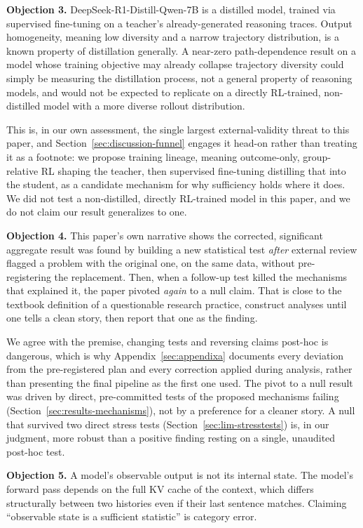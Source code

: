 \documentclass{article}
\begin{document}
\textbf{Objection 3.} DeepSeek-R1-Distill-Qwen-7B is a distilled model, trained via supervised fine-tuning on a teacher's already-generated reasoning traces. Output homogeneity, meaning low diversity and a narrow trajectory distribution, is a known property of distillation generally. A near-zero path-dependence result on a model whose training objective may already collapse trajectory diversity could simply be measuring the distillation process, not a general property of reasoning models, and would not be expected to replicate on a directly RL-trained, non-distilled model with a more diverse rollout distribution.

This is, in our own assessment, the single largest external-validity threat to this paper, and Section~\ref{sec:discussion-funnel} engages it head-on rather than treating it as a footnote: we propose training lineage, meaning outcome-only, group-relative RL shaping the teacher, then supervised fine-tuning distilling that into the student, as a candidate mechanism for why sufficiency holds where it does. We did not test a non-distilled, directly RL-trained model in this paper, and we do not claim our result generalizes to one.

\textbf{Objection 4.} This paper's own narrative shows the corrected, significant aggregate result was found by building a new statistical test \emph{after} external review flagged a problem with the original one, on the same data, without pre-registering the replacement. Then, when a follow-up test killed the mechanisms that explained it, the paper pivoted \emph{again} to a null claim. That is close to the textbook definition of a questionable research practice, construct analyses until one tells a clean story, then report that one as the finding.

We agree with the premise, changing tests and reversing claims post-hoc is dangerous, which is why Appendix~\ref{sec:appendixa} documents every deviation from the pre-registered plan and every correction applied during analysis, rather than presenting the final pipeline as the first one used. The pivot to a null result was driven by direct, pre-committed tests of the proposed mechanisms failing (Section~\ref{sec:results-mechanisms}), not by a preference for a cleaner story. A null that survived two direct stress tests (Section~\ref{sec:lim-stresstests}) is, in our judgment, more robust than a positive finding resting on a single, unaudited post-hoc test.

\textbf{Objection 5.} A model's observable output is not its internal state. The model's forward pass depends on the full KV cache of the context, which differs structurally between two histories even if their last sentence matches. Claiming ``observable state is a sufficient statistic'' is category error.
\end{document}
